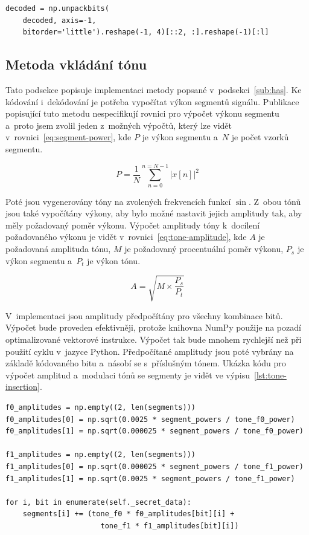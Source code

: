 \begin{lstlisting}[language=PythonPlus, label={lst:get-4-bits-from-byte},
caption={Extrakce prvních 4~bitů z~každého bajtu.}]
decoded = np.unpackbits(
    decoded, axis=-1,
    bitorder='little').reshape(-1, 4)[::2, :].reshape(-1)[:l]
\end{lstlisting}

\subsection*{Metoda vkládání tónu}
\label{sub:tone-insertion-implementation}

Tato podsekce popisuje implementaci metody popsané v~podsekci~\ref{sub:has}. Ke
kódování i~dekódování je potřeba vypočítat výkon segmentů signálu. Publikace
popisující tuto metodu nespecifikují rovnici pro výpočet výkonu segmentu
a~proto jsem zvolil jeden z~možných výpočtů, který lze vidět
v~rovnici~\ref{eq:segment-power}, kde $P$ je výkon segmentu a~$N$ je počet
vzorků segmentu.

\begin{equation}
    \label{eq:segment-power}
    P = \frac{1}{N} \sum_{n=0}^{n=N-1}{|x[n]|^2}
\end{equation}

\noindent Poté jsou vygenerovány tóny na zvolených frekvencích funkcí $\sin$. Z~obou tónů
jsou také vypočítány výkony, aby bylo možné nastavit jejich amplitudy tak, aby
měly požadovaný poměr výkonu. Výpočet amplitudy tóny k~docílení požadovaného
výkonu je vidět v~rovnici~\ref{eq:tone-amplitude}, kde $A$ je požadovaná
amplituda tónu, $M$ je požadovaný procentuální poměr výkonu, $P_s$ je výkon
segmentu a~$P_t$ je výkon tónu.

\begin{equation}
    \label{eq:tone-amplitude}
    A = \sqrt{M \times \frac{P_s}{P_t}}
\end{equation}

\noindent V~implementaci jsou amplitudy předpočítány pro všechny kombinace
bitů. Výpočet bude proveden efektivněji, protože knihovna NumPy použije na
pozadí optimalizované vektorové instrukce. Výpočet tak bude mnohem rychlejší
než při použití cyklu v~jazyce Python. Předpočítané amplitudy jsou poté vybrány
na základě kódovaného bitu a~násobí se s~příslušným tónem. Ukázka kódu pro
výpočet amplitud a~modulaci tónů se segmenty je vidět ve
výpisu~\ref{lst:tone-insertion}.

\begin{lstlisting}[language=PythonPlus, label={lst:tone-insertion},
caption={Výpočet amplitud a~přidání tónů k~segmentům.}]
f0_amplitudes = np.empty((2, len(segments)))
f0_amplitudes[0] = np.sqrt(0.0025 * segment_powers / tone_f0_power)
f0_amplitudes[1] = np.sqrt(0.000025 * segment_powers / tone_f0_power)

f1_amplitudes = np.empty((2, len(segments)))
f1_amplitudes[0] = np.sqrt(0.000025 * segment_powers / tone_f1_power)
f1_amplitudes[1] = np.sqrt(0.0025 * segment_powers / tone_f1_power)

for i, bit in enumerate(self._secret_data):
    segments[i] += (tone_f0 * f0_amplitudes[bit][i] +
                      tone_f1 * f1_amplitudes[bit][i])
\end{lstlisting}

